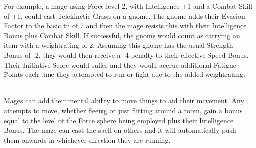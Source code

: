 \begin{multicols}{2}
For example, a mage using Force level 2, with Intelligence +1 and a Combat Skill of +1, could cast Telekinetic Grasp on a gnome.
The gnome adds their Evasion Factor to the basic \gls{tn} of 7 and then the mage resists this with their Intelligence Bonus plus Combat Skill.
If successful, the gnome would count as carrying an item with a \gls{weightrating} of 2.
Assuming this gnome has the usual Strength Bonus of -2, they would then receive a -4 penalty to their effective Speed Bonus.
Their Initiative Score would suffer and they would accrue additional Fatigue Points each time they attempted to run or fight due to the added \gls{weightrating}.

\\
Mages can add their mental ability to move things to aid their movement.
Any attempts to move, whether fleeing or just flitting around a room, gain a bonus equal to the level of the Force sphere being employed plus their Intelligence Bonus.
The mage can cast the spell on others and it will automatically push them onwards in whichever direction they are running.

\end{multicols}


